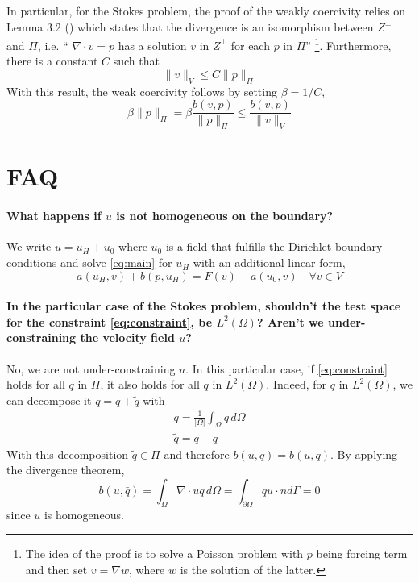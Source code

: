 \documentclass[a4paper,10pt]{article}
\begin{document}
  In particular, for the Stokes problem, the proof of the weakly coercivity relies on Lemma 3.2 (\cite{}) which states that the divergence is an isomorphism between $Z^\perp$ and $\Pi$, i.e. `` $\nabla \cdot v =p$ has a solution $v$ in $Z^\perp$ for each $p$ in $\Pi$'' \footnote{The idea of the proof is to solve a Poisson problem with $p$ being forcing term and then set $v= \nabla w$, where $w$ is the solution of the latter.}. Furthermore, there is a constant $C$ such that
  \begin{equation}
   \|v\|_V \leq C \|p\|_\Pi
  \end{equation}
  With this result, the weak coercivity follows by setting $\beta = 1/C$,
  \begin{equation}
  \beta \|p\|_\Pi = \beta\frac{b(v,p)}{\|p\|_\Pi} \leq \frac{b(v,p)}{\|v\|_V}
  \end{equation}
  
  \section*{FAQ}
  \paragraph{What happens if $u$ is not homogeneous on the boundary?}
  
  We write $u = u_H + u_0$ where $u_0$ is a field that fulfills the Dirichlet boundary conditions and solve \cref{eq:main} for $u_H$ with an additional linear form,
  \begin{equation}
   a(u_H,v) + b(p,u_H) = F(v) - a(u_0,v) \quad \forall v \in V
  \end{equation}

  \paragraph{In the particular case of the Stokes problem, shouldn't the test space for the constraint \cref{eq:constraint}, be $L^2(\Omega)$? Aren't we under-constraining the velocity field $u$?}
  No, we are not under-constraining $u$. In this particular case, if \cref{eq:constraint} holds for all $q$ in $\Pi$, it also holds for all $q$ in $L^2(\Omega)$. Indeed, for $q$ in $L^2(\Omega)$, we can decompose it $q = \bar{q}+\tilde{q}$ with
  \begin{gather*}
   \bar{q}   = \frac{1}{|\Omega|} \int_\Omega q \,d\Omega\\
   \tilde{q} = q-\bar{q}
  \end{gather*}
  With this decomposition $\tilde{q} \in \Pi$ and therefore $b(u,q) = b(u,\bar{q})$. By applying the divergence theorem,
  \begin{equation}
   b(u,\bar{q}) = \int_\Omega \nabla \cdot u q \,d\Omega = \int_{\partial \Omega} q u \cdot n d\Gamma = 0
  \end{equation}
  since $u$ is homogeneous.
\end{document}
